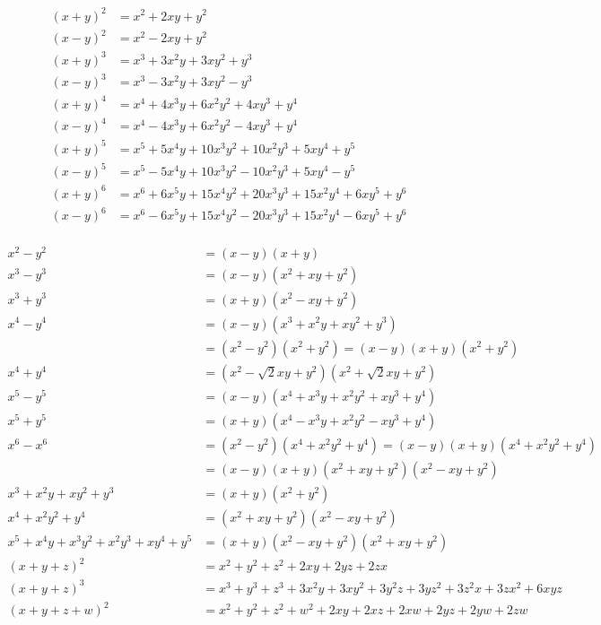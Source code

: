 \begin{align*}
  (x+y)^{2}&=x^{2}+2xy+y^{2} \\
  (x-y)^{2}&=x^{2}-2xy+y^{2} \\
  (x+y)^{3}&=x^{3}+3x^{2}y+3xy^{2}+y^{3} \\
  (x-y)^{3}&=x^{3}-3x^{2}y+3xy^{2}-y^{3} \\
  (x+y)^{4}&=x^{4}+4x^{3}y+6x^{2}y^{2}+4xy^{3}+y^{4} \\
  (x-y)^{4}&=x^{4}-4x^{3}y+6x^{2}y^{2}-4xy^{3}+y^{4} \\
  (x+y)^{5}&=x^{5}+5x^{4}y+10x^{3}y^{2}+10x^{2}y^{3}+5xy^{4}+y^{5} \\
  (x-y)^{5}&=x^{5}-5x^{4}y+10x^{3}y^{2}-10x^{2}y^{3}+5xy^{4}-y^{5} \\
  (x+y)^{6}&=x^{6}+6x^{5}y+15x^{4}y^{2}+20x^{3}y^{3}+15x^{2}y^{4}+6xy^{5}+y^{6} \\
  (x-y)^{6}&=x^{6}-6x^{5}y+15x^{4}y^{2}-20x^{3}y^{3}+15x^{2}y^{4}-6xy^{5}+y^{6} \\
\end{align*}

\begin{align*}
  x^{2}-y^{2}&=(x-y)(x+y) \\
  x^{3}-y^{3}&=(x-y)(x^{2}+xy+y^{2}) \\
  x^{3}+y^{3}&=(x+y)(x^{2}-xy+y^{2}) \\
  x^{4}-y^{4}&=(x-y)(x^{3}+x^{2}y+xy^{2}+y^{3}) \\
    &=(x^{2}-y^{2})(x^{2}+y^{2})=(x-y)(x+y)(x^{2}+y^{2}) \\
  x^{4}+y^{4}&=(x^{2}-\sqrt{2}xy+y^{2})(x^{2}+\sqrt{2}xy+y^{2}) \\
  x^{5}-y^{5}&=(x-y)(x^{4}+x^{3}y+x^{2}y^{2}+xy^{3}+y^{4}) \\
  x^{5}+y^{5}&=(x+y)(x^{4}-x^{3}y+x^{2}y^{2}-xy^{3}+y^{4}) \\
  x^{6}-x^{6}&=(x^{2}-y^{2})(x^{4}+x^{2}y^{2}+y^{4})=(x-y)(x+y)(x^{4}+x^{2}y^{2}+y^{4}) \\
  &=(x-y)(x+y)(x^{2}+xy+y^{2})(x^{2}-xy+y^{2}) \\
  x^{3}+x^{2}y+xy^{2}+y^{3}&=(x+y)(x^{2}+y^{2}) \\
  x^{4}+x^{2}y^{2}+y^{4}&=(x^{2}+xy+y^{2})(x^{2}-xy+y^{2}) \\
  x^{5}+x^{4}y+x^{3}y^{2}+x^{2}y^{3}+xy^{4}+y^{5}&=(x+y)(x^{2}-xy+y^{2})(x^{2}+xy+y^{2})\\
  (x+y+z)^{2}&=x^{2}+y^{2}+z^{2}+2xy+2yz+2zx \\
  (x+y+z)^{3}&=x^{3}+y^{3}+z^{3}+3x^{2}y+3xy^{2}+3y^{2}z+3yz^{2}+3z^{2}x+3zx^{2}+6xyz \\
  (x+y+z+w)^{2}&=x^{2}+y^{2}+z^{2}+w^{2}+2xy+2xz+2xw+2yz+2yw+2zw\\
\end{align*}


